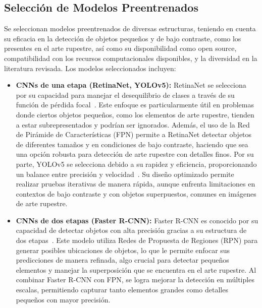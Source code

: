 \subsection{Selección de Modelos Preentrenados}
Se seleccionan modelos preentrenados de diversas estructuras, teniendo en cuenta su eficacia en la detección de objetos pequeños y de bajo contraste, como los presentes en el arte rupestre, así como su disponibilidad como open source, compatibilidad con los recursos computacionales disponibles, y la diversidad en la literatura revisada.
Los modelos seleccionados incluyen:

\begin{itemize}
    \item \textbf{CNNs de una etapa (RetinaNet, YOLOv5):}
    RetinaNet se selecciona por su capacidad para manejar el desequilibrio de clases a través de su función de pérdida focal~\cite{lin2017focal}.
    Este enfoque es particularmente útil en problemas donde ciertos objetos pequeños, como los elementos de arte rupestre, tienden a estar subrepresentados y podrían ser ignorados.
    Además, el uso de la Red de Pirámide de Características (FPN) permite a RetinaNet detectar objetos de diferentes tamaños y en condiciones de bajo contraste, haciendo que sea una opción robusta para detección de arte rupestre con detalles finos.
    Por su parte, YOLOv5 se selecciona debido a su rapidez y eficiencia, proporcionando un balance entre precisión y velocidad~\cite{yolov5}.
    Su diseño optimizado permite realizar pruebas iterativas de manera rápida, aunque enfrenta limitaciones en contextos de bajo contraste y con objetos superpuestos, comunes en imágenes de arte rupestre.

    \item \textbf{CNNs de dos etapas (Faster R-CNN):}
    Faster R-CNN es conocido por su capacidad de detectar objetos con alta precisión gracias a su estructura de dos etapas~\cite{ren2015faster}.
    Este modelo utiliza Redes de Propuesta de Regiones (RPN) para generar posibles ubicaciones de objetos, lo que le permite enfocar sus predicciones de manera refinada, algo crucial para detectar pequeños elementos y manejar la superposición que se encuentra en el arte rupestre.
    Al combinar Faster R-CNN con FPN, se logra mejorar la detección en múltiples escalas, permitiendo capturar tanto elementos grandes como detalles pequeños con mayor precisión.


\end{itemize}
